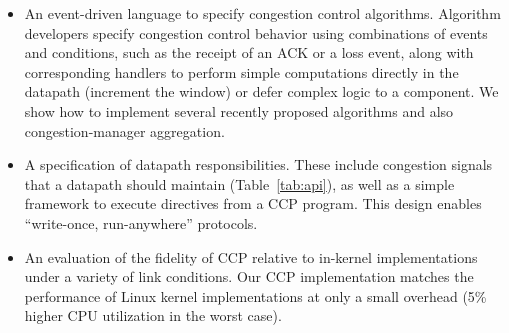 \begin{itemize}
\item An event-driven language to specify congestion control
  algorithms. Algorithm developers specify congestion control behavior using
  combinations of events and conditions, such as the receipt of an
  ACK or a loss event, along with corresponding handlers to perform
  simple computations directly in the datapath (\eg increment the window) or defer
  complex logic to a \userspace component. We show how to implement several recently proposed algorithms and also congestion-manager aggregation. 

\item A specification of datapath responsibilities. These include congestion
  signals that a datapath should maintain (Table~\ref{tab:api}), as
  well as a simple framework to execute directives from a CCP program. This
  design enables ``write-once, run-anywhere'' protocols.


\item An evaluation of the fidelity of CCP relative to in-kernel
  implementations under a variety of link conditions. Our CCP implementation
  matches the performance of Linux kernel implementations at only a small
  overhead (5\% higher CPU utilization in the worst case).

\end{itemize}
